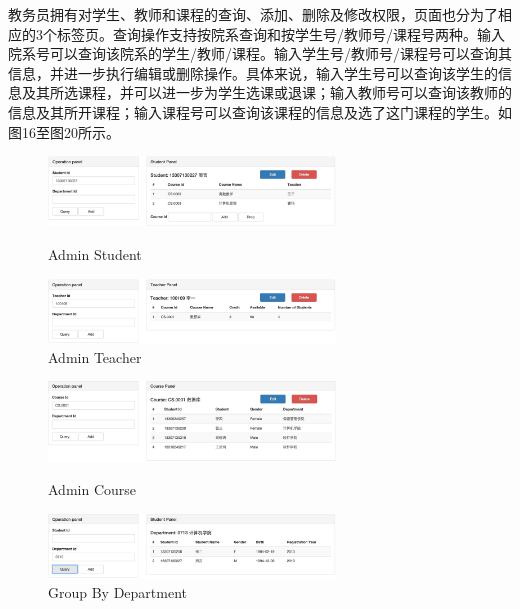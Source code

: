 \documentclass[a4paper, 11pt, nofonts, nocap, fancyhdr]{ctexart}
\begin{document}
	教务员拥有对学生、教师和课程的查询、添加、删除及修改权限，页面也分为了相应的3个标签页。查询操作支持按院系查询和按学生号/教师号/课程号两种。输入院系号可以查询该院系的学生/教师/课程。输入学生号/教师号/课程号可以查询其信息，并进一步执行编辑或删除操作。具体来说，输入学生号可以查询该学生的信息及其所选课程，并可以进一步为学生选课或退课；输入教师号可以查询该教师的信息及其所开课程；输入课程号可以查询该课程的信息及选了这门课程的学生。如图16至图20所示。

	\begin{figure}[ht]
		\begin{minipage}{0.5\textwidth}
			\centering
			\includegraphics[width=3in]{adstu}
			\caption{Admin Student}
		\end{minipage}%
		\begin{minipage}{0.5\textwidth}
			\centering
			\includegraphics[width=3in]{adtea}
			\caption{Admin Teacher}
		\end{minipage}
	\end{figure}

	\vspace{0.8cm}

	\begin{figure}[ht]
		\begin{minipage}{0.5\textwidth}
			\centering
			\includegraphics[width=3in]{adcou}
			\caption{Admin Course}
		\end{minipage}%
		\begin{minipage}{0.5\textwidth}
			\centering
			\includegraphics[width=3in]{addep}
			\caption{Group By Department}
		\end{minipage}
	\end{figure}
\end{document}

